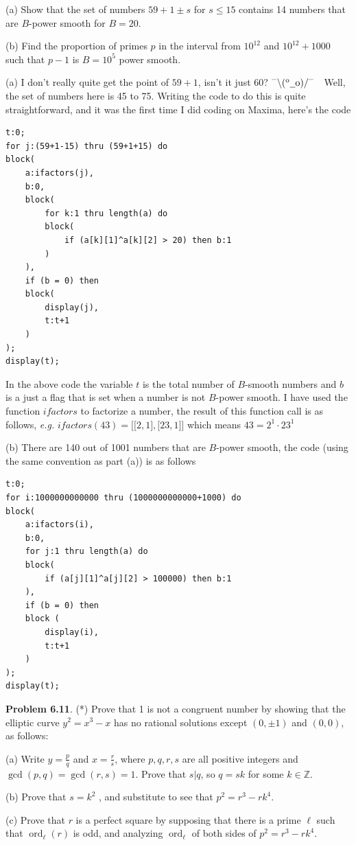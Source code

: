 \documentclass[aps,preprint,preprintnumbers,nofootinbib,showpacs,prd]{revtex4-1}
\newcommand{\eg}{{\it e.g.} }
\newcommand{\dunno}{$ {}^{\mbox {--}}\backslash(^{\rm o}{}\underline{\hspace{0.2cm}}{\rm o})/^{\mbox {--}}$}
\DeclareMathOperator{\ord}{ord}
\begin{document}
(a) Show that the set of numbers $59 + 1 \pm s$ for $s \le 15$ contains 14 numbers that are $B$-power smooth for $B = 20$.

(b) Find the proportion of primes $p$ in the interval from $10^{12}$ and $10^{12} + 1000$ such that $p - 1$ is $B = 10^5$ power smooth.

(a) I don't really quite get the point of $59 + 1$, isn't it just $60$? \dunno ~~Well, the set of numbers here is 45 to 75. Writing the code to do this is quite straightforward, and it was the first time I did coding on Maxima, here's the code
%
\begin{verbatim}
t:0;
for j:(59+1-15) thru (59+1+15) do
block(
    a:ifactors(j),
    b:0,
    block(
        for k:1 thru length(a) do
        block(
            if (a[k][1]^a[k][2] > 20) then b:1
        )
    ),
    if (b = 0) then 
    block(
        display(j),
        t:t+1
    )  
);
display(t);
\end{verbatim}
%
In the above code the variable $t$ is the total number of $B$-smooth numbers and $b$ is a just a flag that is set when a number is not $B$-power smooth. I have used the function $ifactors$ to factorize a number, the result of this function call is as follows, \eg $ifactors(43) = \lbrack\lbrack2,1\rbrack,\lbrack23,1\rbrack\rbrack$ which means $43 = 2^1 \cdot 23^1$

(b) There are 140 out of 1001 numbers that are $B$-power smooth, the code (using the same convention as part (a)) is as follows
\begin{verbatim}
t:0;
for i:1000000000000 thru (1000000000000+1000) do
block(
    a:ifactors(i),
    b:0,
    for j:1 thru length(a) do
    block(
        if (a[j][1]^a[j][2] > 100000) then b:1
    ),
    if (b = 0) then 
    block (
        display(i),
        t:t+1
    )
);
display(t);
\end{verbatim}

{\bf Problem 6.11}. (*) Prove that 1 is not a congruent number by showing that the elliptic curve $y^2 = x^3 - x$ has no rational solutions except $(0, \pm1)$ and $(0, 0)$, as follows:

(a) Write $y = \frac{p}{q}$ and $x = \frac{r}{s}$, where $p, q, r, s$ are all positive integers
and $\gcd(p, q) = \gcd(r, s) = 1$. Prove that $s | q$, so $q = sk$ for some $k \in \mathbb{Z}$.

(b) Prove that $s = k^2$ , and substitute to see that $p^2 = r^3 - rk^4$.

(c) Prove that $r$ is a perfect square by supposing that there is a prime $\ell$ such that $\ord_\ell(r)$ is odd, and analyzing $\ord_\ell$ of both sides of $p^2 = r^3 - rk^4$.
\end{document}
